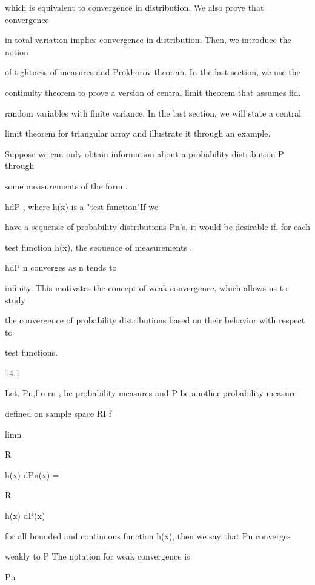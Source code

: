 which is equivalent to convergence in distribution. We also prove that convergence

in total variation implies convergence in distribution. Then, we introduce the notion

of tightness of measures and Prokhorov theorem. In the last section, we use the

continuity theorem to prove a version of central limit theorem that assumes iid.

random variables with finite variance. In the last section, we will state a central

limit theorem for triangular array and illustrate it through an example.

Suppose we can only obtain information about a probability distribution P through

some measurements of the form .

\int

hdP , where h(x) is a "test function"If we

have a sequence of probability distributions Pn's, it would be desirable if, for each

test function h(x), the sequence of measurements .

\int

hdP n converges as n tends to

infinity. This motivates the concept of weak convergence, which allows us to study

the convergence of probability distributions based on their behavior with respect to

test functions.

\begin{defbox}{14.1}
\end{defbox}

Let. Pn,f o rn , be probability measures and P be another probability measure

defined on sample space RI f

limn\to\infty

\int

R

h(x) dPn(x) =

\int

R

h(x) dP(x)

for all bounded and continuous function h(x), then we say that Pn converges

weakly to P The notation for weak convergence is

Pn

